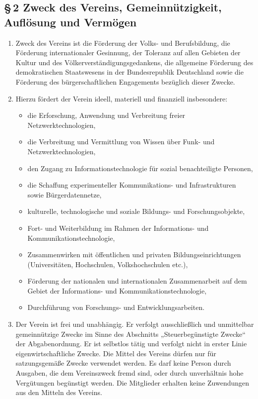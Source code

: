 \documentclass[12pt,a4paper]{article}
\begin{document}
\subsection*{§\,2 Zweck des Vereins, Gemeinnützigkeit, Auflösung und Vermögen}
\begin{enumerate}
\item Zweck des Vereins ist die Förderung der Volks-‭ ‬und Berufsbildung, die Förderung internationaler Gesinnung, der Toleranz auf allen Gebieten der Kultur und des Völkerverständigungsgedankens, ‬die allgemeine Förderung des demokratischen Staatswesens in der Bundesrepublik Deutschland sowie die Förderung des bürgerschaftlichen Engagements bezüglich dieser Zwecke.
\item Hierzu fördert der Verein ideell, materiell und finanziell insbesondere:
\begin{itemize}
\item die Erforschung, Anwendung und Verbreitung freier Netzwerktechnologien,
\item die Verbreitung und Vermittlung von Wissen über Funk- und Netzwerktechnologien,
\item den Zugang zu Informationstechnologie für sozial benachteiligte Personen,
\item die Schaffung experimenteller Kommunikations- und Infrastrukturen sowie Bürgerdatennetze,
\item kulturelle, technologische und soziale Bildungs- und Forschungsobjekte,
\item Fort- und Weiterbildung im Rahmen der Informations- und Kommunikationstechnologie,
\item Zusammenwirken mit öffentlichen und privaten Bildungseinrichtungen (Universitäten, Hochschulen, Volkshochschulen etc.),
\item Förderung der nationalen und internationalen Zusammenarbeit auf dem Gebiet der Informations- und Kommunikationstechnologie,
\item Durchführung von Forschungs- und Entwicklungsarbeiten.
\end{itemize}
\item Der Verein ist frei und unabhängig. Er verfolgt ausschließlich und unmittelbar gemeinnützige Zwecke im Sinne des Abschnitts „Steuerbegünstigte Zwecke“ der Abgabenordnung. Er ist selbstlos tätig und verfolgt nicht in erster Linie eigenwirtschaftliche Zwecke. Die Mittel des Vereins dürfen nur für satzungsgemäße Zwecke verwendet werden. Es darf keine Person durch Ausgaben, die dem Vereinszweck fremd sind, oder durch unverhältnis hohe Vergütungen begünstigt werden. Die Mitglieder erhalten keine Zuwendungen aus den Mitteln des Vereins.

\end{enumerate}
\end{document}
